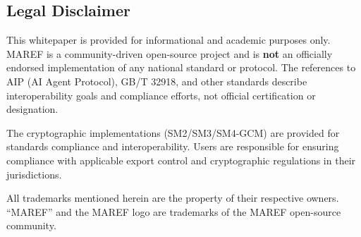 \documentclass[11pt,a4paper]{article}
\begin{document}
\subsection*{Legal Disclaimer}

This whitepaper is provided for informational and academic purposes only. MAREF is a community-driven open-source project and is \textbf{not} an officially endorsed implementation of any national standard or protocol. The references to AIP (AI Agent Protocol), GB/T 32918, and other standards describe interoperability goals and compliance efforts, not official certification or designation.

The cryptographic implementations (SM2/SM3/SM4-GCM) are provided for standards compliance and interoperability. Users are responsible for ensuring compliance with applicable export control and cryptographic regulations in their jurisdictions.

All trademarks mentioned herein are the property of their respective owners. ``MAREF'' and the MAREF logo are trademarks of the MAREF open-source community.
\end{document}
